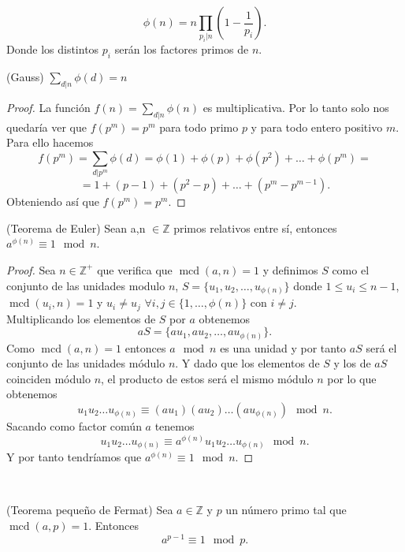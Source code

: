 \begin{corolario}
	 $$\phi(n)=n\prod_{p_i|n}\left(1-\frac{1}{p_i}\right).$$ 
	 Donde los distintos $p_i$ serán los factores primos de $n$.
\end{corolario}

\begin{lema}
		(Gauss) $\sum_{d|n}\phi(d)=n$
\end{lema}
\begin{proof}
		La función $f(n)=\sum_{d|n}\phi(n)$   es multiplicativa. Por lo tanto solo nos quedaría ver que $f(p^m)=p^m$ para todo primo $p$ y para todo entero positivo $m$.\\ Para ello hacemos
		$$
			f(p^m)=\sum_{d|p^m}\phi(d)=\phi(1)+\phi(p)+\phi(p^2)+\dots+\phi(p^m)= 
		$$\vspace*{-5mm}
		$$
			= 1+(p-1)+(p^2-p)+\dots+(p^m-p^{m-1}).
		$$
		Obteniendo así que $f(p^m)=p^m$.
\end{proof}
\begin{teorema}
	(Teorema de Euler) Sean a,n $\in \mathbb{Z}$ primos relativos entre sí, entonces $a^{\phi(n)}\equiv 1 \mod n$.
\end{teorema}
\begin{proof}
		Sea $n\in \mathbb{Z^+}$ que verifica que $\operatorname{mcd}(a,n)=1$ y definimos $S$ como el conjunto de las unidades modulo $n$, $S=\{u_1,u_2,\dots,u_{\phi(n)}\}$ donde $1\leq u_i\leq n-1$, $\operatorname{mcd}(u_i,n)=1$ y $u_i\neq u_j$ $\forall i,j \in \{1,\dots,\phi(n)\}$ con $ i\neq j$.\\
	Multiplicando  los elementos de $S$ por $a$ obtenemos 
	$$
		aS=\{au_1,au_2,\dots,au_{\phi(n)}\}.
	$$
	Como $\operatorname{mcd}(a,n)=1$ entonces $a\mod n$ es una unidad y por tanto $aS$ será el conjunto de las unidades módulo $n$. Y dado que los elementos de $S$ y los de $aS$ coinciden módulo $n$, el producto de estos será el mismo módulo $n$ por lo que obtenemos 
	$$
		u_1u_2\dots u_{\phi(n)} \equiv (au_1)(au_2)\dots (au_{\phi(n)})\mod n.
	$$
	Sacando como factor común $a$ tenemos 
	$$
		u_1u_2\dots u_{\phi(n)} \equiv a^{\phi(n)}u_1u_2\dots u_{\phi(n)}\mod n. 
	$$
	Y por tanto tendríamos que $a^{\phi(n)}\equiv 1 \mod n$.
\end{proof}\\

\begin{teorema}
		(Teorema pequeño de Fermat) Sea $a \in \mathbb{Z}$ y $p$ un número primo tal que $\operatorname{mcd}(a,p)=1$. Entonces
	$$
		a^{p-1} \equiv 1 \mod p.
	$$
\end{teorema}

